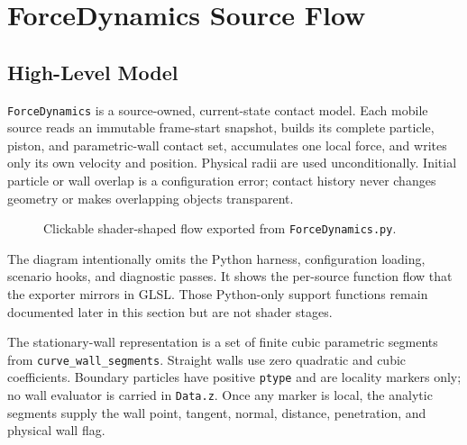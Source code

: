 \newpage
\section{ForceDynamics Source Flow}

\newcommand{\ForceFunctionSection}[1]{%
  \subsection{ForceDynamics:#1}%
  \label{force:#1}%
}
\newcommand{\ForceFunctionEntry}[2]{%
  \subsubsection{\texttt{\protect\detokenize{#1}}}%
  \label{force:#1}%
  #2%
}

\subsection{High-Level Model}

\texttt{ForceDynamics} is a source-owned, current-state contact model.  Each
mobile source reads an immutable frame-start snapshot, builds its complete
particle, piston, and parametric-wall contact set, accumulates one local force,
and writes only its own velocity and position.  Physical radii are used
unconditionally.  Initial particle or wall overlap is a configuration error;
contact history never changes geometry or makes overlapping objects
transparent.

\begin{figure}[htbp]
\centering
\resizebox{0.98\textwidth}{!}{}
\caption{Clickable shader-shaped flow exported from \texttt{ForceDynamics.py}.}
\label{fig:force-dynamics-flow}
\end{figure}

The diagram intentionally omits the Python harness, configuration loading,
scenario hooks, and diagnostic passes.  It shows the per-source function flow
that the exporter mirrors in GLSL.  Those Python-only support functions remain
documented later in this section but are not shader stages.

The stationary-wall representation is a set of finite cubic parametric
segments from \texttt{curve\_wall\_segments}.  Straight walls use zero
quadratic and cubic coefficients.  Boundary particles have positive
\texttt{ptype} and are locality markers only; no wall evaluator is carried in
\texttt{Data.z}.  Once any marker is local, the analytic segments supply the
wall point, tangent, normal, distance, penetration, and physical wall flag.

